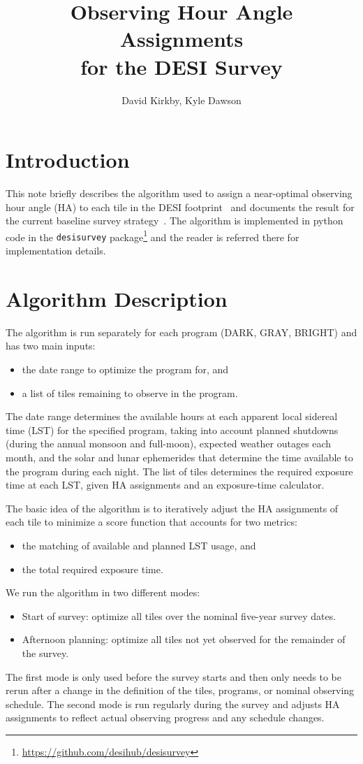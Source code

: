 \documentclass[12pt]{article}
\title{Observing Hour Angle Assignments\\
for the DESI Survey\\
\vspace{5mm}{\large\bf DESI-doc-3060-v1}}
\author{David Kirkby, Kyle Dawson}
\begin{document}
\maketitle

\section{Introduction}

This note briefly describes the algorithm used to assign a near-optimal observing hour angle (HA) to each tile in the DESI footprint~\cite{desi-717} and documents the result for the current baseline survey strategy~\cite{desi-1767, desi-1770}. The algorithm is implemented in python code in the {\tt desisurvey} package\footnote{\url{https://github.com/desihub/desisurvey}} and the reader is referred there for implementation details.

\section{Algorithm Description}

The algorithm is run separately for each program (DARK, GRAY, BRIGHT) and has two main inputs:
\begin{itemize}
    \item the date range to optimize the program for, and
    \item a list of tiles remaining to observe in the program.
\end{itemize}
The date range determines the available hours at each apparent local sidereal time (LST) for the specified program, taking into account planned shutdowns (during the annual monsoon and full-moon), expected weather outages each month, and the solar and lunar ephemerides that determine the time available to the program during each night. The list of tiles determines the required exposure time at each LST, given HA assignments and an exposure-time calculator.

The basic idea of the algorithm is to iteratively adjust the HA assignments of each tile to minimize a score function that accounts for two metrics:
\begin{itemize}
    \item the matching of available and planned LST usage, and
    \item the total required exposure time.
\end{itemize}
We run the algorithm in two different modes:
\begin{itemize}
    \item Start of survey: optimize all tiles over the nominal five-year survey dates.
    \item Afternoon planning: optimize all tiles not yet observed for the remainder of the survey.
\end{itemize}
The first mode is only used before the survey starts and then only needs to be rerun after a change in the definition of the tiles, programs, or nominal observing schedule. The second mode is run regularly during the survey and adjusts HA assignments to reflect actual observing progress and any schedule changes.
\end{document}
